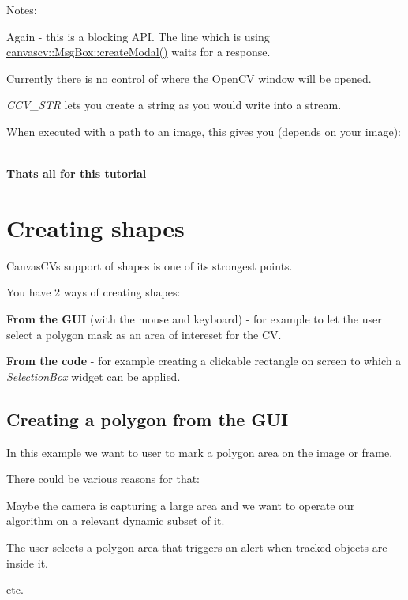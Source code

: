 Notes\+:
\begin{DoxyItemize}
\item Again -\/ this is a blocking A\+PI. The line which is using \hyperlink{classcanvascv_1_1MsgBox_a1eb6af15c2393ce6cda9ce277c01d200}{canvascv\+::\+Msg\+Box\+::create\+Modal()} waits for a response.
\item Currently there is no control of where the Open\+CV window will be opened.
\item {\itshape C\+C\+V\+\_\+\+S\+TR} lets you create a string as you would write into a stream.
\item When executed with a path to an image, this gives you (depends on your image)\+:  ~\newline

\end{DoxyItemize}

{\bfseries That\textquotesingle{}s all for this tutorial} \hypertarget{tutshapes}{}\section{Creating shapes}\label{tutshapes}
Canvas\+CV\textquotesingle{}s support of shapes is one of it\textquotesingle{}s strongest points.

You have 2 ways of creating shapes\+:
\begin{DoxyItemize}
\item {\bfseries From the G\+UI} (with the mouse and keyboard) -\/ for example to let the user select a polygon mask as an area of intereset for the CV.
\item {\bfseries From the code} -\/ for example creating a clickable rectangle on screen to which a {\itshape Selection\+Box} widget can be applied.
\end{DoxyItemize}\hypertarget{tutshapes_shapes_s1}{}\subsection{Creating a polygon from the G\+UI}\label{tutshapes_shapes_s1}
In this example we want to user to mark a polygon area on the image or frame.

There could be various reasons for that\+:
\begin{DoxyItemize}
\item Maybe the camera is capturing a large area and we want to operate our algorithm on a relevant dynamic subset of it.
\item The user selects a polygon area that triggers an alert when tracked objects are inside it.
\item etc.
\end{DoxyItemize}

